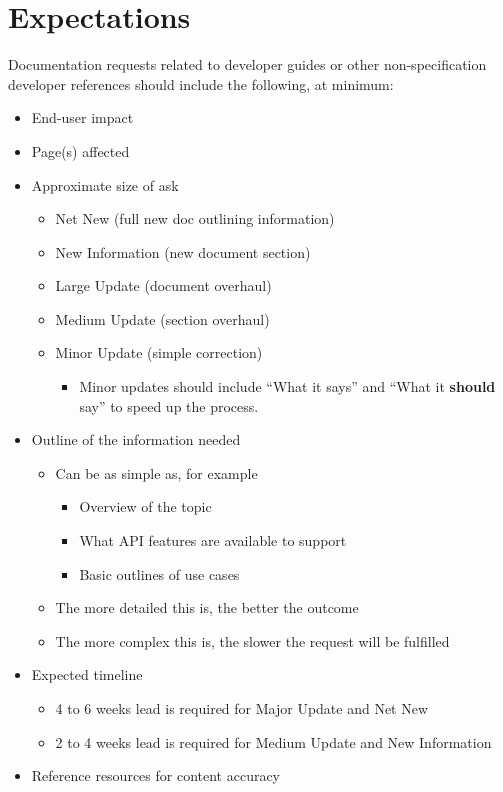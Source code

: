 \documentclass[a4paper]{article}
\begin{document}
\section*{Expectations}
Documentation requests related to developer guides or other non-specification developer references should include the following, at minimum:
\begin{itemize}
	\item End-user impact
	\item Page(s) affected
	\item Approximate size of ask
	\begin{itemize}
		\item Net New (full new doc outlining information)
		\item New Information (new document section)
		\item Large Update (document overhaul)
		\item Medium Update (section overhaul)
		\item Minor Update (simple correction)
		\begin{itemize}
			\item Minor updates should include ``What it says'' and ``What it \textbf{should} say'' to speed up the process.
		\end{itemize}
	\end{itemize}
	\item Outline of the information needed
	\begin{itemize}
		\item Can be as simple as, for example
		\begin{itemize}
			\item Overview of the topic
			\item What API features are available to support
			\item Basic outlines of use cases
		\end{itemize}
		\item The more detailed this is, the better the outcome
		\item The more complex this is, the slower the request will be fulfilled
	\end{itemize}
	\item Expected timeline
	\begin{itemize}
		\item 4 to 6 weeks lead is required for Major Update and Net New
		\item 2 to 4 weeks lead is required for Medium Update and New Information
	\end{itemize}
	\item Reference resources for content accuracy
\end{itemize}
\end{document}
